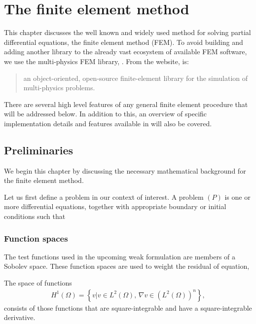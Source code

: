 \chapter{The finite element method}

This chapter discusses the well known and widely used method for solving partial differential equations, the finite element method (FEM).
To avoid building and adding another library to the already vast ecosystem of available FEM software, we use the multi-physics FEM library, \oomph.
From the website, \oomph is:
\begin{quote}
	an object-oriented, open-source finite-element library for the simulation of multi-physics problems. \cite{oomph}
\end{quote}
There are several high level features of any general finite element procedure that will be addressed below.
In addition to this, an overview of specific implementation details and features available in \oomph will also be covered.




\section{Preliminaries}

We begin this chapter by discussing the necessary mathematical background for the finite element method.

Let us first define a problem in our context of interest.
A problem $(P)$ is one or more differential equations, together with appropriate boundary or initial conditions such that 

\iffalse WHAT DO WE NEED TO INCLUDE?

* Sobolev spaces
* Hilbert spaces 
* Banach spaces
* Norms/inner products

\fi



\subsection{Function spaces}
The test functions used in the upcoming weak formulation are members of a Sobolev space.
These function spaces are used to weight the residual of equation, 

The space of functions
\begin{align}
	H^1(\Omega) = \left\{ v | v \in L^2(\Omega), \, \nabla v \in (L^2(\Omega))^n \right\},
\end{align}
consists of those functions that are square-integrable and have a square-integrable derivative.



